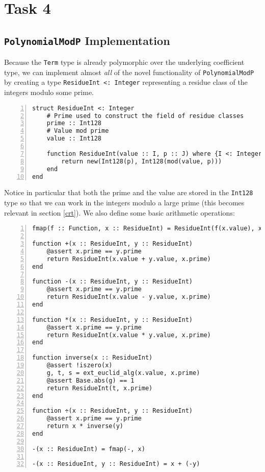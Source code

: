 \documentclass{article}
\theoremstyle{plain}
\numberwithin{theorem}{section}
\numberwithin{example}{section}
\theoremstyle{definition}
\numberwithin{definition}{section}
\begin{document}
\bigbreak

\section{Task 4}
\subsection{\texttt{PolynomialModP} Implementation}
Because the \texttt{Term} type is already polymorphic over the
underlying coefficient type, we can implement almost \emph{all} of the novel
functionality of \texttt{PolynomialModP} by creating a type
\texttt{ResidueInt <: Integer} representing a residue class of the integers
modulo some prime.

\begin{codebox}
    \begin{Verbatim}[numbers=left,xleftmargin=5mm]
struct ResidueInt <: Integer
    # Prime used to construct the field of residue classes
    prime :: Int128
    # Value mod prime
    value :: Int128

    function ResidueInt(value :: I, p :: J) where {I <: Integer, J <: Integer}
        return new(Int128(p), Int128(mod(value, p)))
    end
end

    \end{Verbatim}
\end{codebox}

Notice in particular that both the prime and the value are stored in the
\texttt{Int128} type so that we can work in the integers modulo a large prime
(this becomes relevant in section \ref{crt}). We also define some basic
arithmetic operations:

\begin{codebox}
    \begin{Verbatim}[numbers=left,xleftmargin=5mm]
fmap(f :: Function, x :: ResidueInt) = ResidueInt(f(x.value), x.prime)

function +(x :: ResidueInt, y :: ResidueInt)
    @assert x.prime == y.prime
    return ResidueInt(x.value + y.value, x.prime)
end

function -(x :: ResidueInt, y :: ResidueInt)
    @assert x.prime == y.prime
    return ResidueInt(x.value - y.value, x.prime)
end

function *(x :: ResidueInt, y :: ResidueInt)
    @assert x.prime == y.prime
    return ResidueInt(x.value * y.value, x.prime)
end

function inverse(x :: ResidueInt)
    @assert !iszero(x)
    g, t, s = ext_euclid_alg(x.value, x.prime)
    @assert Base.abs(g) == 1
    return ResidueInt(t, x.prime)
end

function ÷(x :: ResidueInt, y :: ResidueInt)
    @assert x.prime == y.prime
    return x * inverse(y)
end

-(x :: ResidueInt) = fmap(-, x)

-(x :: ResidueInt, y :: ResidueInt) = x + (-y)
    \end{Verbatim}
\end{codebox}
\end{document}
